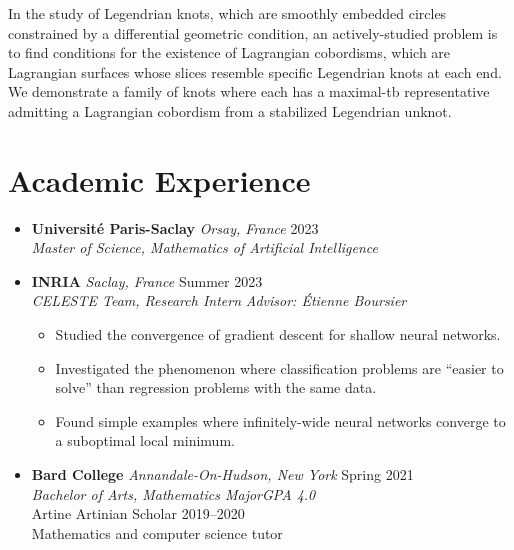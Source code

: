 \documentclass[12pt,letterpaper]{article}
\newenvironment{explist}
{\begin{itemize}[label=\textbf{--},itemsep=1pt,topsep=0pt,partopsep=0pt,parsep=0pt]}
{\end{itemize}}
\begin{document}
\begin{itemize}[label=]
        In the study of Legendrian knots, which are smoothly embedded circles constrained by a differential geometric condition,
        an actively-studied problem is to find conditions for the existence of Lagrangian cobordisms,
        which are Lagrangian surfaces whose slices resemble specific Legendrian knots at each end.
        We demonstrate a family of knots where each has a maximal-tb representative admitting a Lagrangian cobordism from a stabilized Legendrian unknot.

\end{itemize}

\section*{Academic Experience}
\begin{itemize}[label=]
    \item
        \textbf{Université Paris-Saclay} \textit{Orsay, France} \hfill 2023\\
        \textit{Master of Science, Mathematics of Artificial Intelligence}

    \item
        \textbf{INRIA} \textit{Saclay, France} \hfill Summer 2023\\
        \textit{CELESTE Team, Research Intern}
        \textit{Advisor: \'Etienne Boursier}
        \begin{explist}
        \item Studied the convergence of gradient descent for shallow neural networks.
        \item Investigated the phenomenon where classification problems are ``easier to solve'' than regression problems with the same data.
        \item Found simple examples where infinitely-wide neural networks converge to a suboptimal local minimum.
        \end{explist}

    \item
        \textbf{Bard College} \textit{Annandale-On-Hudson, New York} \hfill Spring 2021\\
        \textit{Bachelor of Arts, Mathematics Major}\hfill \textit{GPA 4.0}\\
        Artine Artinian Scholar 2019--2020\\
        Mathematics and computer science tutor


\end{itemize}
\end{document}
